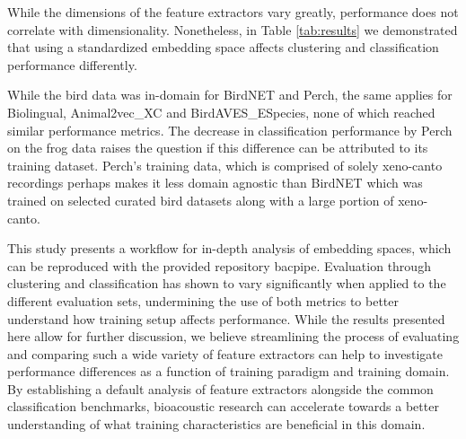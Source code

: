 While the dimensions of the feature extractors vary greatly, performance does not correlate with dimensionality.
Nonetheless, in Table \ref{tab:results} we demonstrated that using a standardized embedding space affects clustering and classification performance differently.


While the bird data was in-domain for BirdNET and Perch, the same applies for Biolingual, Animal2vec\_XC and BirdAVES\_ESpecies, none of which reached similar performance metrics.
The decrease in classification performance by Perch on the frog data raises the question if this difference can be attributed to its training dataset.
Perch's training data, which is comprised of solely xeno-canto recordings perhaps makes it less domain agnostic than BirdNET which was trained on selected curated bird datasets along with a large portion of xeno-canto.


This study presents a workflow for in-depth analysis of embedding spaces, which can be reproduced with the provided repository bacpipe.
Evaluation through clustering and classification has shown to vary significantly when applied to the different evaluation sets, undermining the use of both metrics to better understand how training setup affects performance.
While the results presented here allow for further discussion, we believe streamlining the process of evaluating and comparing such a wide variety of feature extractors can help to investigate performance differences as a function of training paradigm and training domain.
By establishing a default analysis of feature extractors alongside the common classification benchmarks, bioacoustic research can accelerate towards a better understanding of what training characteristics are beneficial in this domain.